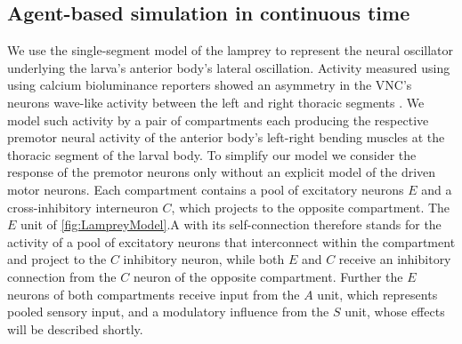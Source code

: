\documentclass[11pt,a4paper]{article}
\begin{document}
\subsection{Agent-based simulation in continuous time}
We use the single-segment model of the lamprey \citep{lansner1997realistic} to represent the neural oscillator underlying the larva's anterior body's lateral oscillation. Activity measured using using calcium bioluminance reporters  showed an asymmetry in the VNC's neurons wave-like activity between the left and right thoracic segments \citep{berni2015genetic}. We model such activity by a pair of compartments each producing the respective premotor neural activity of the anterior  body's left-right bending muscles at the thoracic segment of the larval body. To simplify our model we consider the response of the premotor neurons only without an explicit model of the driven motor neurons. Each compartment contains a pool of excitatory neurons $E$ and a cross-inhibitory interneuron $C$, which projects to the opposite compartment. The $E$ unit of \ref{fig:LampreyModel}.A with its self-connection therefore stands for the activity of a pool of excitatory neurons that interconnect within the compartment and project to the $C$ inhibitory neuron, while both  $E$ and $C$ receive an inhibitory connection from the $C$ neuron of the opposite compartment. Further the $E$ neurons of both compartments receive input from the $A$ unit, which represents pooled sensory input, and a modulatory influence from the $S$ unit, whose effects will be described shortly.
\end{document}

